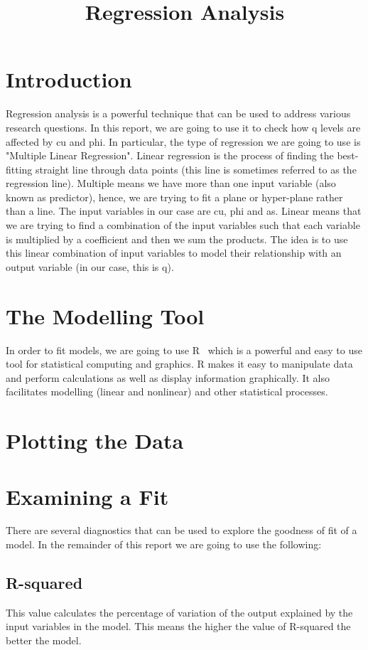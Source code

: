 \documentclass[a4paper,12pt, english]{article}
\begin{document}
\title{Regression Analysis}
\maketitle

\section{Introduction}
Regression analysis is a powerful technique that can be used to address various research questions. In this report, we are going to use it to check how q levels are affected by cu and phi. In particular, the type of regression we are going to use is "Multiple Linear Regression". Linear regression is the process of finding the best-fitting straight line through data points (this line is sometimes referred to as the regression line). Multiple means we have more than one input variable (also known as predictor), hence, we are trying to fit a plane or hyper-plane rather than a line.  The input variables in our case are cu, phi and as. Linear means that we are trying to find a combination of the input variables such that each variable is multiplied by a coefficient and then we sum the products. The idea is to use this linear combination of input variables to model their relationship with an output variable (in our case, this is q).

\section{The Modelling Tool}
In order to fit models, we are going to use R~\cite{R} which is a powerful and easy to use tool for statistical computing and graphics. R makes it easy to manipulate data and perform calculations as well as display information graphically. It also facilitates modelling (linear and nonlinear) and other statistical processes.
\section{Plotting the Data}


\section{Examining a Fit}
There are several diagnostics that can be used to explore the goodness of fit of a model. In the remainder of this report we are going to use the following:
\subsection{R-squared}
This value calculates the percentage of variation of the output explained by the input variables in the model. This means the higher the value of R-squared the better the model. 
\end{document}
